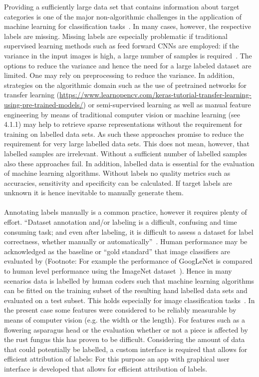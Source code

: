 Providing a sufficiently large data set that contains information about target categories is one of the major non-algorithmic challenges in the application of machine learning for classification tasks~\citep{al2018labeling}. In many cases, however, the respective labels are missing. Missing labels are especially problematic if traditional supervised learning methods such as feed forward CNNs are employed: if the variance in the input images is high, a large number of samples is required~\citep{russakovsky2015imagenet}. 
The options to reduce the variance and hence the need for a large labeled dataset are limited. One may rely on preprocessing to reduce the variance. In addition, strategies on the algorithmic domain such as the use of pretrained networks for transfer learning (\url{https://www.learnopencv.com/keras-tutorial-transfer-learning-using-pre-trained-models/}) or semi-supervised learning as well as manual feature engineering by means of traditional computer vision or machine learning (see 4.1.1) may help to retrieve sparse representations without the requirement for training on labelled data sets. As such these approaches promise to reduce the requirement for very large labelled data sets. This does not mean, however, that labelled samples are irrelevant. Without a sufficient number of labelled samples also these approaches fail. In addition, labelled data is essential for the evaluation of machine learning algorithms. Without labels no quality metrics such as accuracies, sensitivity and specificity can be calculated. If target labels are unknown it is hence inevitable to manually generate them. \\
\\
Annotating labels manually is a common practice, however it requires plenty of effort. “Dataset annotation and/or labeling is a difficult, confusing and time consuming task; and even after labeling, it is difficult to assess a dataset for label correctness, whether manually or automatically”~\citep{al2018labeling}. Human performance may be acknowledged as the baseline or “gold standard” that image classifiers are evaluated by (Footnote: For example the performance of GoogLeNet is compared to human level performance using the ImageNet dataset~\citep{russakovsky2015imagenet}). Hence in many scenarios data is labelled by human coders such that machine learning algorithms can be fitted on the training subset of the resulting hand labelled data sets and evaluated on a test subset. This holds especially for image classification tasks~\citep{russakovsky2015imagenet}. In the present case some features were considered to be reliably measurable by means of computer vision (e.g. the width or the length). For features such as a flowering asparagus head or the evaluation whether or not a piece is affected by the rust fungus this has proven to be difficult. Considering the amount of data that could potentially be labelled, a custom interface is required that allows for efficient attribution of labels: For this purpose an app with graphical user interface is developed that allows for efficient attribution of labels. \\
